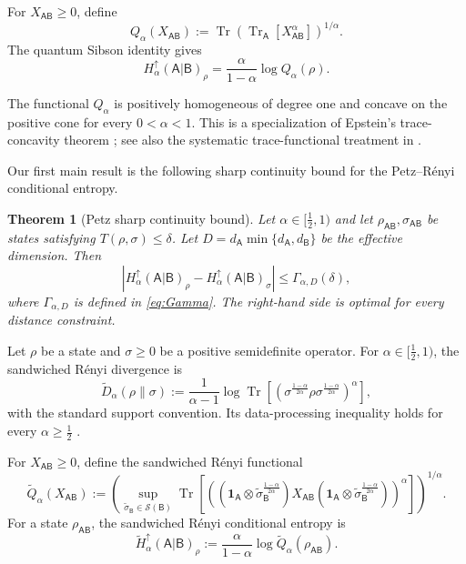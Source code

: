 \documentclass[11pt,reqno]{amsart}
\newtheorem{theorem}{Theorem}[section]
\theoremstyle{definition}
\DeclareMathOperator{\Tr}{Tr}
\newcommand{\I}{\mathbf 1}
\newcommand{\A}{\mathsf{A}}
\newcommand{\B}{\mathsf{B}}
\newcommand{\states}[1]{\mathcal{S}(#1)}
\newcommand{\abs}[1]{\left\lvert#1\right\rvert}
\newcommand{\sand}{\widetilde}
\begin{document}
For $X_{\A\B}\geq0$, define
\begin{equation}\label{eq:Q-functional}
 Q_\alpha(X_{\A\B})
 :=\Tr\!\left(\Tr_{\A}[X_{\A\B}^\alpha]\right)^{1/\alpha}.
\end{equation}
The quantum Sibson identity \cite[Lemma~3]{SharmaWarsi2013} gives
\begin{equation}\label{eq:Sibson-formula}
 H_\alpha^\uparrow(\A|\B)_\rho
 =\frac{\alpha}{1-\alpha}\log Q_\alpha(\rho).
\end{equation}

The functional $Q_\alpha$ is positively homogeneous of degree one and concave
on the positive cone for every $0<\alpha<1$.  This is a specialization of
Epstein's trace-concavity theorem \cite{Epstein1973}; see also the systematic
trace-functional treatment in \cite{CarlenFrankLieb2016}.


Our first main result is the following sharp continuity bound for the Petz--R\'enyi conditional entropy.

\begin{theorem}[Petz sharp continuity bound]\label{thm:main}
	Let $\alpha\in[\frac12,1)$ and let $\rho_{\A\B},\sigma_{\A\B}$ be states
	satisfying $T(\rho,\sigma)\leq\delta$.
	Let
	$D=d_{\A}\min\{d_{\A},d_{\B}\}$ be the effective dimension.  Then
	\begin{equation}\label{eq:main-bound-piecewise}
		\boxed{\;\;
			\abs{H_\alpha^\uparrow(\A|\B)_\rho
				-H_\alpha^\uparrow(\A|\B)_\sigma}
			\leq
			\Gamma_{\alpha,D}(\delta),
            \;\;}
	\end{equation}
    where $\Gamma_{\alpha,D}$ is defined in \cref{eq:Gamma}.
	The right-hand side is optimal for every distance constraint.%
\end{theorem}

Let $\rho$ be a state and $\sigma\geq 0$ be a positive semidefinite operator.
For $\alpha\in[\frac12,1)$, the sandwiched R\'enyi divergence \cite{MDS+13, WWY14} is
\begin{equation}
 \sand D_{\alpha}(\rho\|\sigma)
 :=\frac{1}{\alpha-1}
 \log\Tr\!\left[\left(
 \sigma^{\frac{1-\alpha}{2\alpha}}
 \rho
 \sigma^{\frac{1-\alpha}{2\alpha}}
 \right)^{\alpha}\right],
 \label{eq:sand-div}
\end{equation}
with the standard support convention.  Its data-processing inequality holds
for every $\alpha\geq\frac12$
\cite{MDS+13,FL13,Bei13}.

For $X_{\A\B}\geq0$, define the sandwiched R\'enyi functional
\begin{equation}
 \sand Q_{\alpha}(X_{\A\B})
 :=
 \left(
 \sup_{\tilde{\sigma}_{\B}\in\states{\B}}
 \Tr\!\left[\left(
 (\I_{\A}\otimes\tilde{\sigma}_{\B}^{\frac{1-\alpha}{2\alpha}})
 X_{\A\B}
 (\I_{\A}\otimes\tilde{\sigma}_{\B}^{\frac{1-\alpha}{2\alpha}})
 \right)^{\alpha}\right]
 \right)^{1/\alpha}.
 \label{eq:Q}
\end{equation}
For a state $\rho_{\A\B}$, the sandwiched R\'enyi conditional entropy is
\begin{equation}
 \sand H_{\alpha}^{\uparrow}(\A|\B)_{\rho}
 :=\frac{\alpha}{1-\alpha}\log\sand Q_{\alpha}(\rho_{\A\B}).
 \label{eq:H-Q}
\end{equation}
\end{document}
